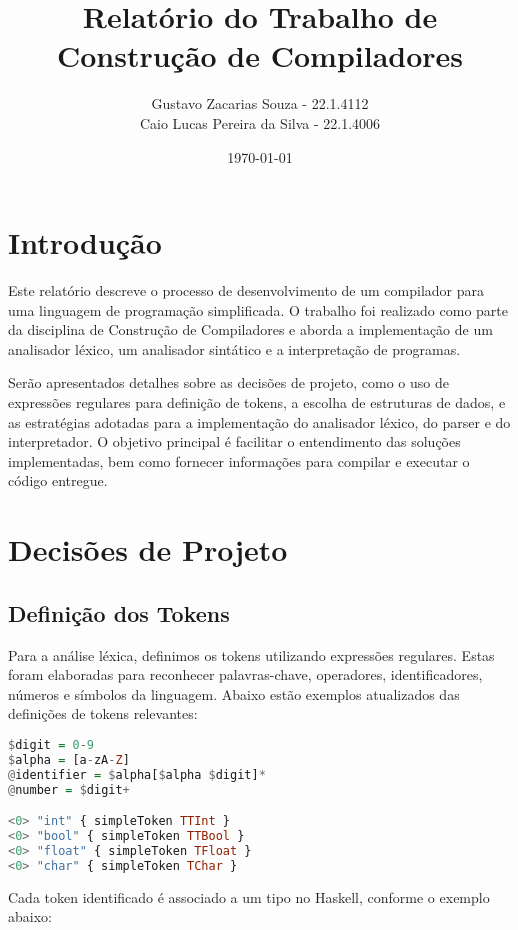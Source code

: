 \documentclass[a4paper,12pt]{article}
\title{Relatório do Trabalho de Construção de Compiladores}
\author{Gustavo Zacarias Souza - 22.1.4112 \\ Caio Lucas Pereira da Silva - 22.1.4006}
\date{\today}
\begin{document}
\maketitle

\tableofcontents

\newpage

\section{Introdução}

Este relatório descreve o processo de desenvolvimento de um compilador para uma linguagem de programação simplificada. O trabalho foi realizado como parte da disciplina de Construção de Compiladores e aborda a implementação de um analisador léxico, um analisador sintático e a interpretação de programas. 

Serão apresentados detalhes sobre as decisões de projeto, como o uso de expressões regulares para definição de tokens, a escolha de estruturas de dados, e as estratégias adotadas para a implementação do analisador léxico, do parser e do interpretador. O objetivo principal é facilitar o entendimento das soluções implementadas, bem como fornecer informações para compilar e executar o código entregue.

\section{Decisões de Projeto}

\subsection{Definição dos Tokens}

Para a análise léxica, definimos os tokens utilizando expressões regulares. Estas foram elaboradas para reconhecer palavras-chave, operadores, identificadores, números e símbolos da linguagem. Abaixo estão exemplos atualizados das definições de tokens relevantes:

\begin{lstlisting}[language=Haskell, caption={Definição de tokens em Alex}]
$digit = 0-9
$alpha = [a-zA-Z]
@identifier = $alpha[$alpha $digit]*
@number = $digit+

<0> "int" { simpleToken TTInt }
<0> "bool" { simpleToken TTBool }
<0> "float" { simpleToken TFloat }
<0> "char" { simpleToken TChar }
\end{lstlisting}

Cada token identificado é associado a um tipo no Haskell, conforme o exemplo abaixo:
\end{document}
